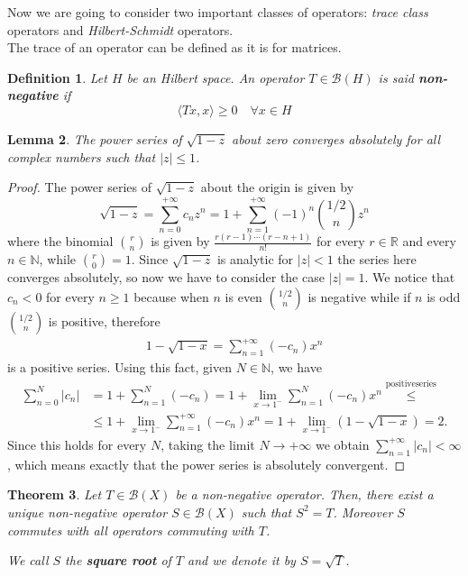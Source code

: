 \documentclass[corpo=11pt, stile=classica, tipotesi=custom,
greek, evenboxes, english]{toptesi}
\numberwithin{equation}{chapter}
\newtheorem{teo}{Theorem}[chapter] %
\newtheorem{defi}[teo]{Definition}
\newtheorem{lem}[teo]{Lemma}
\theoremstyle{remark}
\newcommand{\R}{\mathbb{R}} %
\newcommand{\N}{\mathbb{N}} %
\newcommand{\B}{\mathscr{B}} %
\begin{document}
Now we are going to consider two important classes of operators: \emph{trace class} operators and \emph{Hilbert-Schmidt} operators.\\
The trace of an operator can be defined as it is for matrices.
\begin{defi}\label{non-negative operator}
	Let $H$ be an Hilbert space. An operator $T \in \B(H)$ is said \textbf{non-negative} if
	\begin{equation*}
		\langle T x, x \rangle \geq 0 \quad \forall x \in H
	\end{equation*}
\end{defi}
\begin{lem}\label{power series of square root lemma}
	The power series of $\sqrt{1-z}$ about zero converges absolutely for all complex numbers such that $|z| \leq 1$.
\end{lem}
\begin{proof}
	The power series of $\sqrt{1-z}$ about the origin is given by
	\begin{equation*}
		\sqrt{1-z} = \sum_{n=0}^{+\infty}c_n z^n = 1 + \sum_{n=1}^{+\infty} (-1)^n\binom{1/2}{n} z^n
	\end{equation*}
	where the binomial $\binom{r}{n}$ is given by $\frac{r(r-1)\cdots(r-n+1)}{n!}$ for every $r \in \R$ and every $n \in \N$, while $\binom{r}{0}=1$. Since $\sqrt{1-z}$ is analytic for $|z|<1$ the series here converges absolutely, so now we have to consider the case $|z|=1$. We notice that $c_n < 0$ for every $n \geq 1$ because when $n$ is even $\binom{1/2}{n}$ is negative while if $n$ is odd $\binom{1/2}{n}$ is positive, therefore
	\begin{align*}
		1-\sqrt{1-x} = \sum_{n=1}^{+\infty} (-c_n) x^n
	\end{align*}
	is a positive series. Using this fact, given $N \in \N$, we have
	\begin{align*}
		\sum_{n=0}^{N} |c_n| &= 1 + \sum_{n=1}^{N} (-c_n) = 1 + \lim_{x \rightarrow 1^-} \sum_{n=1}^{N} (-c_n)x^n \overset{\mathrm{positive series}}{\leq} \\
							 &\leq 1 + \lim_{x \rightarrow 1^-} \sum_{n=1}^{+\infty} (-c_n)x^n = 1 + \lim_{x \rightarrow 1^-}(1-\sqrt{1-x}) = 2.
	\end{align*}
	Since this holds for every $N$, taking the limit $N \rightarrow +\infty$ we obtain $\sum_{n=1}^{+\infty} |c_n| < \infty$, which means exactly that the power series is absolutely convergent.
\end{proof}
\begin{teo}\label{existence of square root}
	Let $T \in \B(X)$ be a non-negative operator. Then, there exist a unique non-negative operator $S \in \B(X)$ such that $S^2 = T$. {\color{blue} Moreover $S$ commutes with all operators commuting with $T$}.
	
	We call $S$ the \textbf{square root} of $T$ and we denote it by $S = \sqrt{T}$.
\end{teo}
\end{document}

